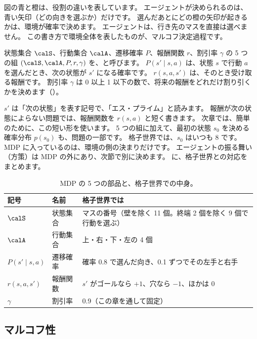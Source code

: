 図の青と橙は、役割の違いを表しています。
エージェントが決められるのは、青い矢印（どの向きを選ぶか）だけです。
選んだあとにどの橙の矢印が起きるかは、環境が確率で決めます。
エージェントは、行き先のマスを直接は選べません。
この書き方で環境全体を表したものが、マルコフ決定過程です。

\begin{definition}[マルコフ決定過程]\label{def:rlb-mdp}
状態集合 $\calS$、行動集合 $\calA$、遷移確率 $P$、報酬関数 $r$、割引率 $\gamma$ の 5 つの組 $(\calS,\calA,P,r,\gamma)$ を、と呼びます。
 $P(s'\mid s,a)$ は、状態 $s$ で行動 $a$ を選んだとき、次の状態が $s'$ になる確率です。
 $r(s,a,s')$ は、そのとき受け取る報酬です。
割引率 $\gamma$ は 0 以上 1 以下の数で、将来の報酬をどれだけ割り引くかを決めます（）。
\end{definition}

$s'$ は「次の状態」を表す記号で、「エス・プライム」と読みます。
報酬が次の状態によらない問題では、報酬関数を $r(s,a)$ と短く書きます。
次章では、簡単のために、この短い形を使います。
5 つの組に加えて、最初の状態 $s_0$ を決める確率分布 $p(s_0)$ も、問題の一部です。
格子世界では、$s_0$ はいつも 8 です。
MDP に入っているのは、環境の側の決まりだけです。
エージェントの振る舞い（方策）は MDP の外にあり、次節で別に決めます。
に、格子世界との対応をまとめます。

\begin{table}[tbp]
\centering
\caption{MDP の 5 つの部品と、格子世界での中身。}
\label{tab:rlb-mdp}
\small
\begin{tabular}{lll}
\toprule
記号 & 名前 & 格子世界では \\
\midrule
$\calS$ & 状態集合 & マスの番号（壁を除く 11 個。終端 2 個を除く 9 個で行動を選ぶ） \\
$\calA$ & 行動集合 & 上・右・下・左の 4 個 \\
$P(s'\mid s,a)$ & 遷移確率 & 確率 0.8 で選んだ向き、0.1 ずつでその左手と右手 \\
$r(s,a,s')$ & 報酬関数 & $s'$ がゴールなら $+1$、穴なら $-1$、ほかは 0 \\
$\gamma$ & 割引率 & 0.9（この章を通して固定） \\
\bottomrule
\end{tabular}
\end{table}

\subsection*{マルコフ性}

